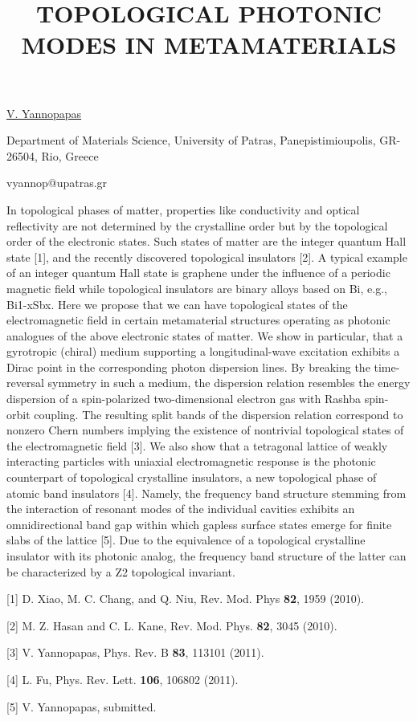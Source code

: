 \title{TOPOLOGICAL PHOTONIC MODES IN METAMATERIALS}

\underline{V. Yannopapas} 

{\normalsize{\vspace{-4mm}
Department of Materials Science, University of Patras, Panepistimioupolis, GR-26504, Rio, Greece

\email vyannop@upatras.gr}}

In topological phases of matter, properties like conductivity and optical reflectivity are not determined by the crystalline order but by the topological order of the electronic states. Such states of matter are the integer quantum Hall state [1], and the recently discovered topological insulators [2]. A typical example of an integer quantum Hall state is graphene under the influence of a periodic magnetic field while topological insulators are binary alloys based on Bi, e.g., Bi1-xSbx. Here we propose that we can have topological states of the electromagnetic field in certain metamaterial structures operating as photonic analogues of the above electronic states of matter.
We show in particular, that a gyrotropic (chiral) medium supporting a longitudinal-wave excitation exhibits a Dirac point in the corresponding photon dispersion lines. By breaking the time-reversal symmetry in such a medium, the dispersion relation resembles the energy dispersion of a spin-polarized two-dimensional electron gas with Rashba spin-orbit coupling. The resulting split bands of the dispersion relation correspond to nonzero Chern numbers implying the existence of nontrivial topological states of the electromagnetic field [3].
We also show that a tetragonal lattice of weakly interacting particles with uniaxial electromagnetic response is the photonic counterpart of topological crystalline insulators, a new topological phase of atomic band insulators [4]. Namely, the frequency band structure stemming from the interaction of resonant modes of the individual cavities exhibits an omnidirectional band gap within which gapless surface states emerge for finite slabs of the lattice [5]. Due to the equivalence of a topological crystalline insulator with its photonic analog, the frequency band structure of the latter can be characterized by a Z2 topological invariant.

{\normalsize
[1] D. Xiao, M. C. Chang, and Q. Niu, Rev. Mod. Phys \textbf{82}, 1959 (2010).
\vsp

[2] M. Z. Hasan and C. L. Kane, Rev. Mod. Phys. \textbf{82}, 3045 (2010).
\vsp

[3] V. Yannopapas, Phys. Rev. B \textbf{83}, 113101 (2011).
\vsp

[4] L. Fu, Phys. Rev. Lett. \textbf{106}, 106802 (2011).
\vsp

[5] V. Yannopapas, submitted.
}

\vspace{\baselineskip} 